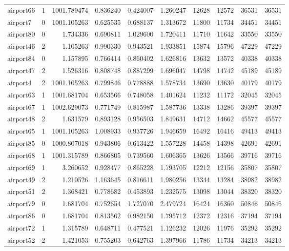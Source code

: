 \begin{longtable}{|l|r|r|r|r|r|r|r|r|r|}
airport66 & 1 & 1001.789474 & 0.836240 & 0.424007 & 1.260247 & 12628 & 12572 & 36531 & 36531 \\
airport7 & 0 & 1001.105263 & 0.625535 & 0.688137 & 1.313672 & 11800 & 11734 & 34451 & 34451 \\
airport80 & 0 & 1.734336 & 0.690811 & 1.029600 & 1.720411 & 11710 & 11642 & 33550 & 33550 \\
airport46 & 2 & 1.105263 & 0.990330 & 0.943521 & 1.933851 & 15874 & 15796 & 47229 & 47229 \\
airport84 & 0 & 1.157895 & 0.766414 & 0.860402 & 1.626816 & 13632 & 13572 & 40338 & 40338 \\
airport47 & 2 & 1.526316 & 0.808748 & 0.887299 & 1.696047 & 14798 & 14742 & 45189 & 45189 \\
airport4 & 2 & 1001.105263 & 0.799846 & 0.778888 & 1.578734 & 13690 & 13630 & 40179 & 40179 \\
airport63 & 1 & 1001.681704 & 0.653566 & 0.748058 & 1.401624 & 11232 & 11172 & 32045 & 32045 \\
airport67 & 1 & 1002.629073 & 0.771749 & 0.815987 & 1.587736 & 13338 & 13286 & 39397 & 39397 \\
airport48 & 2 & 1.631579 & 0.893128 & 0.956503 & 1.849631 & 14712 & 14662 & 45577 & 45577 \\
airport65 & 1 & 1001.105263 & 1.008933 & 0.937726 & 1.946659 & 16492 & 16416 & 49413 & 49413 \\
airport85 & 0 & 1000.807018 & 0.943806 & 0.613422 & 1.557228 & 14458 & 14398 & 42691 & 42691 \\
airport68 & 1 & 1001.315789 & 0.866805 & 0.739560 & 1.606365 & 13626 & 13566 & 39716 & 39716 \\
airport69 & 1 & 3.260652 & 0.928477 & 0.865228 & 1.793705 & 12212 & 12156 & 35807 & 35807 \\
airport49 & 2 & 1.210526 & 1.163645 & 0.816611 & 1.980256 & 13344 & 13284 & 38982 & 38982 \\
airport51 & 2 & 1.368421 & 0.778682 & 0.453893 & 1.232575 & 13098 & 13044 & 38320 & 38320 \\
airport79 & 0 & 1.681704 & 0.752654 & 1.727070 & 2.479724 & 16424 & 16360 & 50846 & 50846 \\
airport86 & 0 & 1.681704 & 0.813562 & 0.982150 & 1.795712 & 12372 & 12316 & 37194 & 37194 \\
airport72 & 1 & 1.315789 & 0.648711 & 0.477521 & 1.126232 & 12026 & 11976 & 35292 & 35292 \\
airport52 & 2 & 1.421053 & 0.755203 & 0.642763 & 1.397966 & 11786 & 11734 & 34213 & 34213 \\

\end{longtable}
